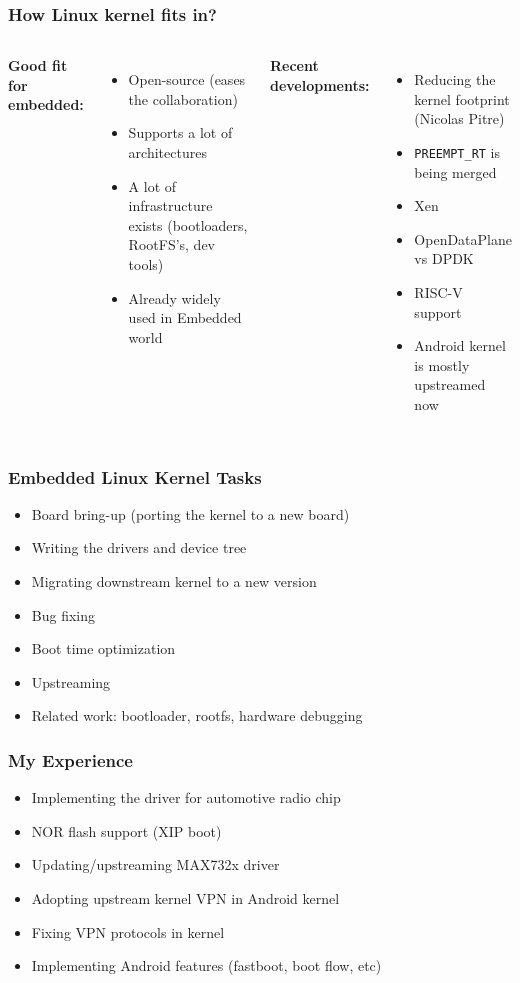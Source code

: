 \begin{frame}
  \frametitle{How Linux kernel fits in?}
  \begin{columns}
    \textbf{Good fit for embedded:}
  \begin{itemize}
    \item Open-source (eases the collaboration)
    \item Supports a lot of architectures
    \item A lot of infrastructure exists (bootloaders, RootFS's, dev tools)
    \item Already widely used in Embedded world
  \end{itemize}

  \pause
  \textbf{Recent developments:}
  \begin{itemize}
    \item Reducing the kernel footprint (Nicolas Pitre)
    \item \texttt{PREEMPT\_RT} is being merged
    \item Xen
    \item OpenDataPlane vs DPDK
    \item RISC-V support
    \item Android kernel is mostly upstreamed now
  \end{itemize}
  \end{columns}
\end{frame}

\begin{frame}
  \frametitle{Embedded Linux Kernel Tasks}
  \begin{itemize}
    \item Board bring-up (porting the kernel to a new board)
    \item Writing the drivers and device tree
    \item Migrating downstream kernel to a new version
    \item Bug fixing
    \item Boot time optimization
    \item Upstreaming
    \item Related work: bootloader, rootfs, hardware debugging
  \end{itemize}
\end{frame}

\begin{frame}
  \frametitle{My Experience}
  \begin{itemize}
    \item Implementing the driver for automotive radio chip
    \item NOR flash support (XIP boot)
    \item Updating/upstreaming MAX732x driver
    \item Adopting upstream kernel VPN in Android kernel
    \item Fixing VPN protocols in kernel
    \item Implementing Android features (fastboot, boot flow, etc)
  \end{itemize}
\end{frame}


